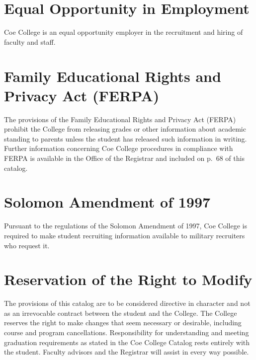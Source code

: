 \documentclass[
  letterpaper,
]{scrbook}
\begin{document}
\hypertarget{equal-opportunity-in-employment}{%
\section*{Equal Opportunity in
Employment}\label{equal-opportunity-in-employment}}


Coe College is an equal opportunity employer in the recruitment and
hiring of faculty and staff.

\hypertarget{family-educational-rights-and-privacy-act-ferpa}{%
\section*{Family Educational Rights and Privacy Act
(FERPA)}\label{family-educational-rights-and-privacy-act-ferpa}}


The provisions of the Family Educational Rights and Privacy Act (FERPA)
prohibit the College from releasing grades or other information about
academic standing to parents unless the student has released such
information in writing. Further information concerning Coe College
procedures in compliance with FERPA is available in the Office of the
Registrar and included on p.~68 of this catalog.

\hypertarget{solomon-amendment-of-1997}{%
\section*{Solomon Amendment of 1997}\label{solomon-amendment-of-1997}}


Pursuant to the regulations of the Solomon Amendment of 1997, Coe
College is required to make student recruiting information available to
military recruiters who request it.

\hypertarget{reservation-of-the-right-to-modify}{%
\section*{Reservation of the Right to
Modify}\label{reservation-of-the-right-to-modify}}


The provisions of this catalog are to be considered directive in
character and not as an irrevocable contract between the student and the
College. The College reserves the right to make changes that seem
necessary or desirable, including course and program cancellations.
Responsibility for understanding and meeting graduation requirements as
stated in the Coe College Catalog rests entirely with the student.
Faculty advisors and the Registrar will assist in every way possible.
\end{document}
